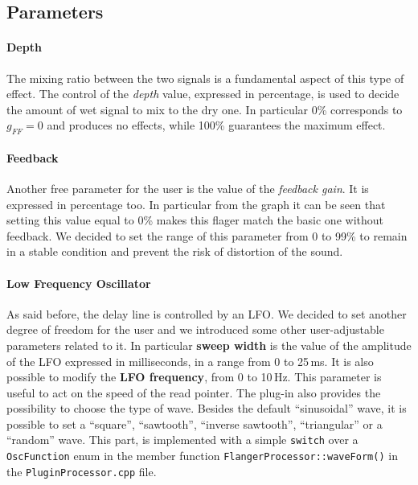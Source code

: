 \subsection{Parameters}\label{sec:parameters}

\paragraph{Depth}
The mixing ratio between the two signals is a fundamental aspect of this type of effect. The control of the \emph{depth} value, expressed in percentage, is used to decide the amount of wet signal to mix to the dry one. In particular 0\% corresponds to $g_{FF} = 0$ and produces no effects, while 100\% guarantees the maximum effect.

\paragraph{Feedback}
Another free parameter for the user is the value of the \emph{feedback gain}. It is expressed in percentage too. In particular from the graph it can be seen that setting this value equal to 0\% makes this flager match the basic one without feedback. 
We decided to set the range of this parameter from 0 to 99\% to remain in a stable condition and prevent the risk of distortion of the sound.

\paragraph{Low Frequency Oscillator}
As said before, the delay line is controlled by an LFO.
We decided to set another degree of freedom for the user and we introduced some other user-adjustable parameters related to it.
In particular \textbf{sweep width} is the value of the amplitude of the LFO expressed in milliseconds, in a range from 0 to 25\,ms.
It is also possible to modify the \textbf{LFO frequency}, from 0 to 10\,Hz.
This parameter is useful to act on the speed of the read pointer.
The plug-in also provides the possibility to choose the type of wave.
Besides the default ``sinusoidal'' wave, it is possible to set a ``square'', ``sawtooth'', ``inverse sawtooth'', ``triangular'' or a ``random'' wave.
This part, is implemented with a simple \texttt{switch} over a \texttt{OscFunction} enum in the member function \texttt{FlangerProcessor::waveForm()} in the \texttt{PluginProcessor.cpp} file.
